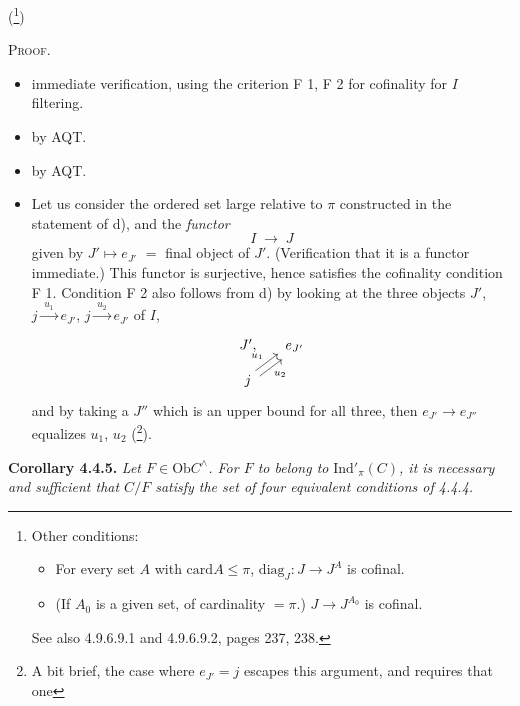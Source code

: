\documentclass[11pt]{article}
\newcommand{\printedpage}[1]{\marginpar{\footnotesize p.~#1}}
\newcommand{\Ind}{\mathrm{Ind}}
\newcommand{\card}{\mathrm{card}}
\newcommand{\Ob}{\mathrm{Ob}}
\begin{document}
(\footnote{Other conditions:
\begin{itemize}[leftmargin=3em]
\item[e)] For every set $A$ with $\card A \leqslant \pi$, $\mathrm{diag}_J : J \longrightarrow J^A$ is cofinal.
\item[e$'$)] (If $A_0$ is a given set, of cardinality $= \pi$.) $J \longrightarrow J^{A_0}$ is cofinal.
\end{itemize}
See also 4.9.6.9.1 and 4.9.6.9.2, pages 237, 238.})

\textsc{Proof}.
\begin{itemize}[leftmargin=7em,labelwidth=6em,align=left]
\item[a $\;\Longrightarrow\;$ b] immediate verification, using the criterion F 1, F 2 for cofinality for $I$ filtering.
\item[b $\;\Longrightarrow\;$ c] by AQT.
\item[c $\;\Longrightarrow\;$ d] by AQT.
\end{itemize}

\printedpage{18}
\begin{itemize}[leftmargin=7em,labelwidth=6em,align=left]
\item[d $\;\Longrightarrow\;$ a] Let us consider the ordered set large relative to $\pi$ constructed in the statement of d), and the \textit{functor}
\[
I \;\longrightarrow\; J
\]
given by $J' \longmapsto e_{J'}$ $=$ final object of $J'$. (Verification that it is a functor immediate.) This functor is surjective, hence satisfies the cofinality condition F 1. Condition F 2 also follows from d) by looking at the three objects $J'$, $j \xrightarrow{\;u_1\;} e_{J'}$, $j \xrightarrow{\;u_2\;} e_{J'}$ of $I$,
\[
\begin{tikzcd}[column sep=small, row sep=small]
J', & e_{J'} \\
j \arrow[ur, shift left, "u_1"] \arrow[ur, shift right, "u_2"'] &
\end{tikzcd}
\]
and by taking a $J''$ which is an upper bound for all three, then $e_{J'} \longrightarrow e_{J''}$ equalizes $u_1$, $u_2$ (\footnote{A bit brief, the case where $e_{J'} = j$ escapes this argument, and requires that one}).
\end{itemize}

\textbf{Corollary 4.4.5.} \textit{Let $F \in \Ob C^{\wedge}$. For $F$ to belong to} $\Ind'_\pi(C)$\textit{, it is necessary and sufficient that $C/F$ satisfy the set of four equivalent conditions of 4.4.4.}
\end{document}
